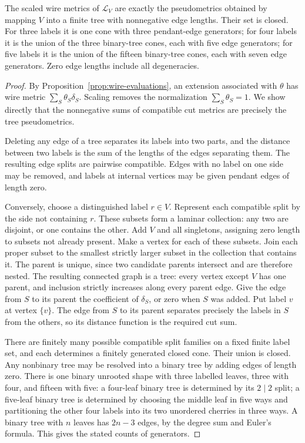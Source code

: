 \begin{theorem}
\label{thm:laminar-tree}
The scaled wire metrics of $\mathcal L_V$ are exactly the pseudometrics obtained by mapping $V$ into a finite tree with nonnegative edge lengths.  Their set is closed.  For three labels it is one cone with three pendant-edge generators; for four labels it is the union of the three binary-tree cones, each with five edge generators; for five labels it is the union of the fifteen binary-tree cones, each with seven edge generators.  Zero edge lengths include all degeneracies.
\end{theorem}
\begin{proof}
By Proposition~\ref{prop:wire-evaluations}, an extension associated with $\theta$ has wire metric $\sum_S\theta_S\delta_S$.  Scaling removes the normalization $\sum_S\theta_S=1$.  We show directly that the nonnegative sums of compatible cut metrics are precisely the tree pseudometrics.

Deleting any edge of a tree separates its labels into two parts, and the distance between two labels is the sum of the lengths of the edges separating them.  The resulting edge splits are pairwise compatible.  Edges with no label on one side may be removed, and labels at internal vertices may be given pendant edges of length zero.

Conversely, choose a distinguished label $r\in V$.  Represent each compatible split by the side not containing $r$.  These subsets form a laminar collection: any two are disjoint, or one contains the other.  Add $V$ and all singletons, assigning zero length to subsets not already present.  Make a vertex for each of these subsets.  Join each proper subset to the smallest strictly larger subset in the collection that contains it.  The parent is unique, since two candidate parents intersect and are therefore nested.  The resulting connected graph is a tree: every vertex except $V$ has one parent, and inclusion strictly increases along every parent edge.  Give the edge from $S$ to its parent the coefficient of $\delta_S$, or zero when $S$ was added.  Put label $v$ at vertex $\{v\}$.  The edge from $S$ to its parent separates precisely the labels in $S$ from the others, so its distance function is the required cut sum.

There are finitely many possible compatible split families on a fixed finite label set, and each determines a finitely generated closed cone.  Their union is closed.  Any nonbinary tree may be resolved into a binary tree by adding edges of length zero.  There is one binary unrooted shape with three labelled leaves, three with four, and fifteen with five: a four-leaf binary tree is determined by its $2\mid2$ split; a five-leaf binary tree is determined by choosing the middle leaf in five ways and partitioning the other four labels into its two unordered cherries in three ways.  A binary tree with $n$ leaves has $2n-3$ edges, by the degree sum and Euler's formula.  This gives the stated counts of generators.
\end{proof}

